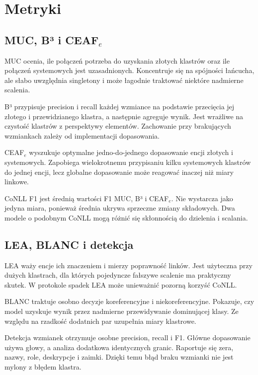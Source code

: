 \section{Metryki}
\label{sec:metryki}

\subsection{MUC, B³ i \texorpdfstring{CEAF$_e$}{CEAF-e}}

MUC ocenia, ile połączeń potrzeba do uzyskania złotych klastrów oraz ile połączeń systemowych jest uzasadnionych. Koncentruje się na spójności łańcucha, ale słabo uwzględnia singletony i może łagodnie traktować niektóre nadmierne scalenia.

B³ przypisuje precision i recall każdej wzmiance na podstawie przecięcia jej złotego i przewidzianego klastra, a następnie agreguje wynik. Jest wrażliwe na czystość klastrów z perspektywy elementów. Zachowanie przy brakujących wzmiankach zależy od implementacji dopasowania.

CEAF$_e$ wyszukuje optymalne jedno-do-jednego dopasowanie encji złotych i systemowych. Zapobiega wielokrotnemu przypisaniu kilku systemowych klastrów do jednej encji, lecz globalne dopasowanie może reagować inaczej niż miary linkowe.

CoNLL F1 jest średnią wartości F1 MUC, B³ i CEAF$_e$. Nie wystarcza jako jedyna miara, ponieważ średnia ukrywa sprzeczne zmiany składowych. Dwa modele o podobnym CoNLL mogą różnić się skłonnością do dzielenia i scalania.

\subsection{LEA, BLANC i detekcja}

LEA waży encje ich znaczeniem i mierzy poprawność linków. Jest użyteczna przy dużych klastrach, dla których pojedyncze fałszywe scalenie ma praktyczny skutek. W protokole spadek LEA może unieważnić pozorną korzyść CoNLL.

BLANC traktuje osobno decyzje koreferencyjne i niekoreferencyjne. Pokazuje, czy model uzyskuje wynik przez nadmierne przewidywanie dominującej klasy. Ze względu na rzadkość dodatnich par uzupełnia miary klastrowe.

Detekcja wzmianek otrzymuje osobne precision, recall i F1. Główne dopasowanie używa głowy, a analiza dodatkowa identycznych granic. Raportuje się zera, nazwy, role, deskrypcje i zaimki. Dzięki temu błąd braku wzmianki nie jest mylony z błędem klastra.

